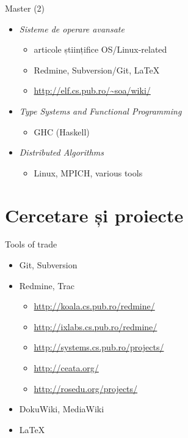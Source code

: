 \documentclass{beamer}
\begin{document}
\begin{frame}{Master (2)}
	\begin{itemize}
		\item \textit{Sisteme de operare avansate}
			\begin{itemize}
				\item articole științifice OS/Linux-related
				\item Redmine, Subversion/Git, \LaTeX
				\item \url{http://elf.cs.pub.ro/~soa/wiki/}
			\end{itemize}
		\item \textit{Type Systems and Functional Programming}
			\begin{itemize}
				\item GHC (Haskell)
			\end{itemize}
		\item \textit{Distributed Algorithms}
			\begin{itemize}
				\item Linux, MPICH, various tools
			\end{itemize}
	\end{itemize}
\end{frame}

\section{Cercetare și proiecte}

\frame{\tableofcontents[currentsection]}

\begin{frame}{Tools of trade}
	\begin{itemize}
		\item Git, Subversion
		\item Redmine, Trac
			\begin{itemize}
				\item \url{http://koala.cs.pub.ro/redmine/}
				\item \url{http://ixlabs.cs.pub.ro/redmine/}
				\item \url{http://systems.cs.pub.ro/projects/}
				\item \url{http://ceata.org/}
				\item \url{http://rosedu.org/projects/}
			\end{itemize}
		\item DokuWiki, MediaWiki
		\item \LaTeX
	\end{itemize}
\end{frame}
\end{document}
